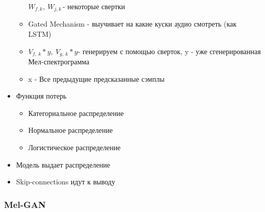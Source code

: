 \documentclass[a4paper, 12pt]{article}
\begin{document}
\begin{itemize}
\begin{itemize}
    \(W_{f,k},\ W_{j,k\ }\)- некоторые свертки
    
  \item
    
    Gated Mechanism - выучивает на какие куски аудио смотреть (как LSTM)
    
  \item
    
    \(V_{f,\ k}*y,\ V_{g,\ k}*y\)- генерируем с помощью сверток, y - уже
    сгенерированная Мел-спектрограмма
    
  \item
    
    x - Все предыдущие предсказанные сэмплы
    
  \end{itemize}
\item
  
  {Функция потерь}
  

  \begin{itemize}
  \item
    
    Категориальное распределение
    
  \item
    
    Нормальное распределение
    
  \item
    
    Логистическое распределение
    
  \end{itemize}
\item
  
  Модель выдает распределение
  
\item
  
  Skip-connections идут к выводу
  
\end{itemize}

\subsubsection{Mel-GAN}\label{mel-gan}
\end{document}
